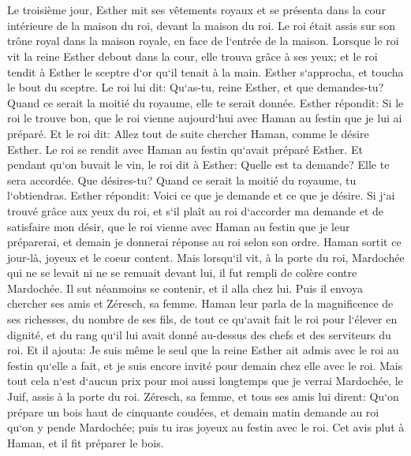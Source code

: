 \chapter{}

\verse Le troisième jour, Esther mit ses vêtements royaux et se présenta dans la cour intérieure de la maison du roi, devant la maison du roi. Le roi était assis sur son trône royal dans la maison royale, en face de l`entrée de la maison. 
\verse Lorsque le roi vit la reine Esther debout dans la cour, elle trouva grâce à ses yeux; et le roi tendit à Esther le sceptre d`or qu`il tenait à la main. Esther s`approcha, et toucha le bout du sceptre. 
\verse Le roi lui dit: Qu`as-tu, reine Esther, et que demandes-tu? Quand ce serait la moitié du royaume, elle te serait donnée. 
\verse Esther répondit: Si le roi le trouve bon, que le roi vienne aujourd`hui avec Haman au festin que je lui ai préparé. 
\verse Et le roi dit: Allez tout de suite chercher Haman, comme le désire Esther. Le roi se rendit avec Haman au festin qu`avait préparé Esther. 
\verse Et pendant qu`on buvait le vin, le roi dit à Esther: Quelle est ta demande? Elle te sera accordée. Que désires-tu? Quand ce serait la moitié du royaume, tu l`obtiendras. 
\verse Esther répondit: Voici ce que je demande et ce que je désire. 
\verse Si j`ai trouvé grâce aux yeux du roi, et s`il plaît au roi d`accorder ma demande et de satisfaire mon désir, que le roi vienne avec Haman au festin que je leur préparerai, et demain je donnerai réponse au roi selon son ordre. 
\verse Haman sortit ce jour-là, joyeux et le coeur content. Mais lorsqu`il vit, à la porte du roi, Mardochée qui ne se levait ni ne se remuait devant lui, il fut rempli de colère contre Mardochée. 
\verse Il sut néanmoins se contenir, et il alla chez lui. Puis il envoya chercher ses amis et Zéresch, sa femme. 
\verse Haman leur parla de la magnificence de ses richesses, du nombre de ses fils, de tout ce qu`avait fait le roi pour l`élever en dignité, et du rang qu`il lui avait donné au-dessus des chefs et des serviteurs du roi. 
\verse Et il ajouta: Je suis même le seul que la reine Esther ait admis avec le roi au festin qu`elle a fait, et je suis encore invité pour demain chez elle avec le roi. 
\verse Mais tout cela n`est d`aucun prix pour moi aussi longtemps que je verrai Mardochée, le Juif, assis à la porte du roi. 
\verse Zéresch, sa femme, et tous ses amis lui dirent: Qu`on prépare un bois haut de cinquante coudées, et demain matin demande au roi qu`on y pende Mardochée; puis tu iras joyeux au festin avec le roi. Cet avis plut à Haman, et il fit préparer le bois. 


